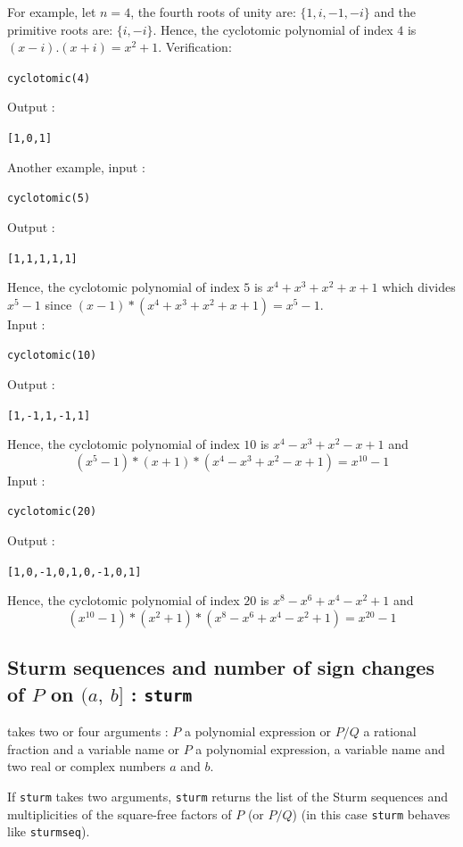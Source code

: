 \documentclass[a4paper,11pt]{book}
\begin{document}
For example, let $n=4$, the fourth roots of unity are:
$\{ 1,i,-1,-i\}$ and the primitive roots are: $\{i,-i\}$.
Hence, the cyclotomic polynomial of index $4$ is $(x-i).(x+i)=x^2+1$.
Verification:
\begin{center}{\tt cyclotomic(4)}\end{center}
Output :
\begin{center}{\tt [1,0,1]}\end{center}
Another example, input :
\begin{center}{\tt cyclotomic(5)}\end{center}
Output :
\begin{center}{\tt [1,1,1,1,1]}\end{center}
Hence, the cyclotomic polynomial of index $5$ is $x^4+x^3+x^2+x+1$
which divides $x^5-1$ since $(x-1)*(x^4+x^3+x^2+x+1)=x^5-1$.\\
Input :
\begin{center}{\tt cyclotomic(10)}\end{center}
Output :
\begin{center}{\tt [1,-1,1,-1,1]}\end{center}
Hence, the cyclotomic polynomial of index $10$ is $x^4-x^3+x^2-x+1$ and
\[ (x^5-1)*(x+1)*(x^4-x^3+x^2-x+1)=x^{10}-1 \]
Input :
\begin{center}{\tt cyclotomic(20)}\end{center}
Output :
\begin{center}{\tt [1,0,-1,0,1,0,-1,0,1]}\end{center}
Hence, the cyclotomic polynomial of index $20$ is $x^8-x^6+x^4-x^2+1$ and
\[ (x^{10}-1)*(x^2+1)*(x^8-x^6+x^4-x^2+1)=x^{20}-1 \]

\subsection{Sturm sequences and number of sign changes 
of $P$ on $(a,\ b]$ : {\tt sturm}}
 takes two or four arguments : $P$ a polynomial expression
or $P/Q$ a rational fraction and a variable name or $P$ a polynomial 
expression, a variable name and two real or complex numbers $a$ and $b$.

If {\tt sturm} takes two arguments, {\tt sturm} returns the list of the Sturm 
sequences and multiplicities of the square-free factors of $P$ (or
$P/Q$) (in this case {\tt sturm} behaves like {\tt sturmseq}).
\end{document}
